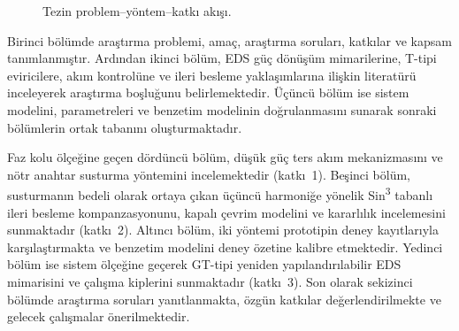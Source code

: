 \begin{figure}[H]
{%
  }
  \caption[Tezin problem--yöntem--katkı akışı]{Tezin problem--yöntem--katkı akışı.}
  \label{fig:tez-akisi}
\end{figure} 


Birinci bölümde araştırma problemi, amaç, araştırma soruları, katkılar ve kapsam tanımlanmıştır. Ardından ikinci bölüm, EDS güç dönüşüm mimarilerine, T-tipi eviricilere, akım kontrolüne ve ileri besleme yaklaşımlarına ilişkin literatürü inceleyerek araştırma boşluğunu belirlemektedir. Üçüncü bölüm ise sistem modelini, parametreleri ve benzetim modelinin doğrulanmasını sunarak sonraki bölümlerin ortak tabanını oluşturmaktadır.

Faz kolu ölçeğine geçen dördüncü bölüm, düşük güç ters akım mekanizmasını ve nötr anahtar susturma yöntemini incelemektedir (katkı~1). Beşinci bölüm, susturmanın bedeli olarak ortaya çıkan üçüncü harmoniğe yönelik Sin\textsuperscript{3} tabanlı ileri besleme kompanzasyonunu, kapalı çevrim modelini ve kararlılık incelemesini sunmaktadır (katkı~2). Altıncı bölüm, iki yöntemi prototipin deney kayıtlarıyla karşılaştırmakta ve benzetim modelini deney özetine kalibre etmektedir. Yedinci bölüm ise sistem ölçeğine geçerek GT-tipi yeniden yapılandırılabilir EDS mimarisini ve çalışma kiplerini sunmaktadır (katkı~3). Son olarak sekizinci bölümde araştırma soruları yanıtlanmakta, özgün katkılar değerlendirilmekte ve gelecek çalışmalar önerilmektedir.
